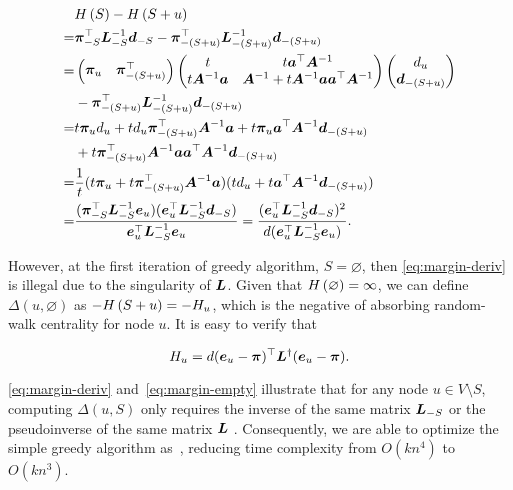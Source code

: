 \documentclass[sigconf]{acmart}
\begin{document}
\begin{equation}\label{eq:margin-deriv}
  \begin{split}
    &H\left(S\right)-H\left(S+u\right)\\
    =&\boldsymbol{\pi}_{-S}^\top\boldsymbol{L}_{-S}^{-1}\boldsymbol{d}_{-S}-\boldsymbol{\pi}_{-(S+u)}^\top\boldsymbol{L}_{-(S+u)}^{-1}\boldsymbol{d}_{-(S+u)}\\
    =&\begin{pmatrix}\boldsymbol{\pi}_u&\boldsymbol{\pi}_{-(S+u)}^\top\end{pmatrix}\begin{pmatrix}t & t\boldsymbol{a}^\top\boldsymbol{A}^{-1} \\t\boldsymbol{A}^{-1}\boldsymbol{a}&\boldsymbol{A}^{-1}+t\boldsymbol{A}^{-1}\boldsymbol{a}\boldsymbol{a}^\top\boldsymbol{A}^{-1}\end{pmatrix}\begin{pmatrix}d_u\\\boldsymbol{d}_{-(S+u)}\end{pmatrix}\\
    &-\boldsymbol{\pi}_{-(S+u)}^\top\boldsymbol{L}_{-(S+u)}^{-1}\boldsymbol{d}_{-(S+u)}\\
    =&t\boldsymbol{\pi}_ud_u+td_u\boldsymbol{\pi}_{-(S+u)}^\top\boldsymbol{A}^{-1}\boldsymbol{a}+t\boldsymbol{\pi}_u\boldsymbol{a}^\top\boldsymbol{A}^{-1}\boldsymbol{d}_{-(S+u)}\\
    &+t\boldsymbol{\pi}_{-(S+u)}^\top\boldsymbol{A}^{-1}\boldsymbol{a}\boldsymbol{a}^\top\boldsymbol{A}^{-1}\boldsymbol{d}_{-(S+u)}\\
    =&\frac1t(t\boldsymbol{\pi}_u+t\boldsymbol{\pi}_{-(S+u)}^\top\boldsymbol{A}^{-1}\boldsymbol{a})(td_u+t\boldsymbol{a}^\top\boldsymbol{A}^{-1}\boldsymbol{d}_{-(S+u)})\\
    =&\frac{(\boldsymbol{\pi}_{-S}^\top\boldsymbol{L}_{-S}^{-1}\boldsymbol{e}_u)(\boldsymbol{e}_u^\top\boldsymbol{L}_{-S}^{-1}\boldsymbol{d}_{-S})}{\boldsymbol{e}_u^\top\boldsymbol{L}_{-S}^{-1}\boldsymbol{e}_u}=\frac{(\boldsymbol{e}_u^\top\boldsymbol{L}_{-S}^{-1}\boldsymbol{d}_{-S})^2}{d(\boldsymbol{e}_u^\top\boldsymbol{L}_{-S}^{-1}\boldsymbol{e}_u)}.
  \end{split}
\end{equation}

However, at the first iteration of greedy algorithm, \(S=\varnothing\), then \eqref{eq:margin-deriv} is illegal due to the singularity of \(\boldsymbol{L}\).
Given that \(H\left(\varnothing\right)=\infty\), we can define \(\Delta(u,\varnothing)\) as \(-H\left(S+u\right)=-H_u\), which is the negative of absorbing random-walk centrality for node \(u\).
It is easy to verify that~\cite{ZhXuZh20}

\begin{equation}\label{eq:margin-empty}
  H_u=d(\boldsymbol{e}_u-\boldsymbol{\pi})^\top\boldsymbol{L}^\dagger(\boldsymbol{e}_u-\boldsymbol{\pi}).
\end{equation}

\eqref{eq:margin-deriv} and~\eqref{eq:margin-empty} illustrate that for any node \(u\in V\setminus S\), computing \(\Delta(u,S)\) only requires the inverse of the same matrix \(\boldsymbol{L}_{-S}\) or the pseudoinverse of the same matrix \(\boldsymbol{L}\) . Consequently, we are able to optimize the simple greedy algorithm as~, reducing time complexity from \(O(kn^4)\) to \(O(kn^3)\).
\end{document}
